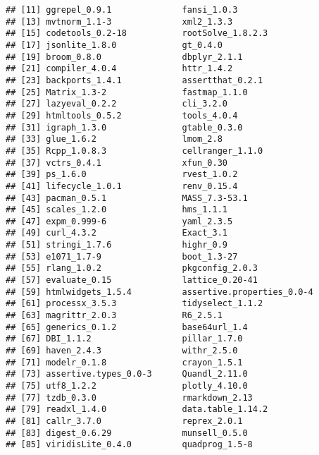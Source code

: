 \documentclass[
]{article}
\begin{document}
\begin{verbatim}
## [11] ggrepel_0.9.1              fansi_1.0.3               
## [13] mvtnorm_1.1-3              xml2_1.3.3                
## [15] codetools_0.2-18           rootSolve_1.8.2.3         
## [17] jsonlite_1.8.0             gt_0.4.0                  
## [19] broom_0.8.0                dbplyr_2.1.1              
## [21] compiler_4.0.4             httr_1.4.2                
## [23] backports_1.4.1            assertthat_0.2.1          
## [25] Matrix_1.3-2               fastmap_1.1.0             
## [27] lazyeval_0.2.2             cli_3.2.0                 
## [29] htmltools_0.5.2            tools_4.0.4               
## [31] igraph_1.3.0               gtable_0.3.0              
## [33] glue_1.6.2                 lmom_2.8                  
## [35] Rcpp_1.0.8.3               cellranger_1.1.0          
## [37] vctrs_0.4.1                xfun_0.30                 
## [39] ps_1.6.0                   rvest_1.0.2               
## [41] lifecycle_1.0.1            renv_0.15.4               
## [43] pacman_0.5.1               MASS_7.3-53.1             
## [45] scales_1.2.0               hms_1.1.1                 
## [47] expm_0.999-6               yaml_2.3.5                
## [49] curl_4.3.2                 Exact_3.1                 
## [51] stringi_1.7.6              highr_0.9                 
## [53] e1071_1.7-9                boot_1.3-27               
## [55] rlang_1.0.2                pkgconfig_2.0.3           
## [57] evaluate_0.15              lattice_0.20-41           
## [59] htmlwidgets_1.5.4          assertive.properties_0.0-4
## [61] processx_3.5.3             tidyselect_1.1.2          
## [63] magrittr_2.0.3             R6_2.5.1                  
## [65] generics_0.1.2             base64url_1.4             
## [67] DBI_1.1.2                  pillar_1.7.0              
## [69] haven_2.4.3                withr_2.5.0               
## [71] modelr_0.1.8               crayon_1.5.1              
## [73] assertive.types_0.0-3      Quandl_2.11.0             
## [75] utf8_1.2.2                 plotly_4.10.0             
## [77] tzdb_0.3.0                 rmarkdown_2.13            
## [79] readxl_1.4.0               data.table_1.14.2         
## [81] callr_3.7.0                reprex_2.0.1              
## [83] digest_0.6.29              munsell_0.5.0             
## [85] viridisLite_0.4.0          quadprog_1.5-8
\end{verbatim}
\end{document}

